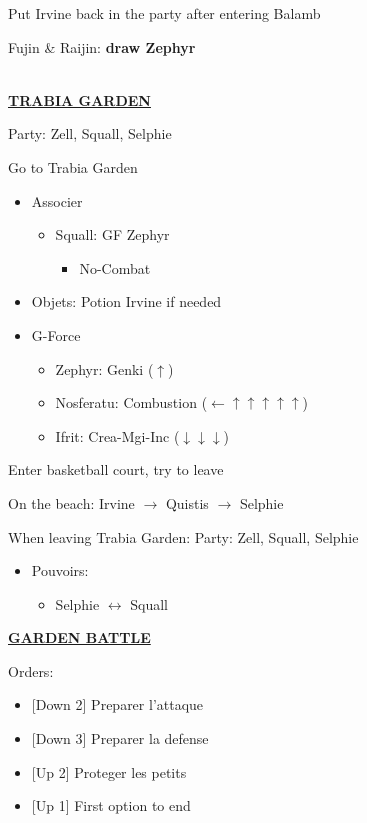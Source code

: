 Put Irvine back in the party after entering Balamb

Fujin \& Raijin: \textbf{draw Zephyr}

\leavevmode\\
\underline{\textbf{TRABIA GARDEN}}

Party: Zell, Squall, Selphie

Go to Trabia Garden

\begin{menu}
	\begin{itemize}
		\item Associer
			\begin{itemize}
				\item Squall: GF Zephyr
					\begin{itemize}
						\item No-Combat
					\end{itemize}
			\end{itemize}
		\item Objets: Potion Irvine if needed
		\item G-Force
			\begin{itemize}
				\item Zephyr: Genki ($\uparrow$)
				\item Nosferatu: Combustion ($\leftarrow\uparrow\uparrow\uparrow\uparrow\uparrow$)
				\item Ifrit: Crea-Mgi-Inc ($\downarrow\downarrow\downarrow$)
			\end{itemize}
	\end{itemize}
\end{menu}

Enter basketball court, try to leave

On the beach: Irvine $\rightarrow$ Quistis $\rightarrow$ Selphie

When leaving Trabia Garden:
Party: Zell, Squall, Selphie
\begin{itemize}
	\item Pouvoirs:
		\begin{itemize}
			\item Selphie $\leftrightarrow$ Squall
		\end{itemize}
\end{itemize}

\underline{\textbf{GARDEN BATTLE}}

Orders:
\begin{itemize}
	\item {[Down 2]} Preparer l'attaque
	\item {[Down 3]} Preparer la defense
	\item {[Up 2]} Proteger les petits
	\item {[Up 1]} First option to end
\end{itemize}

